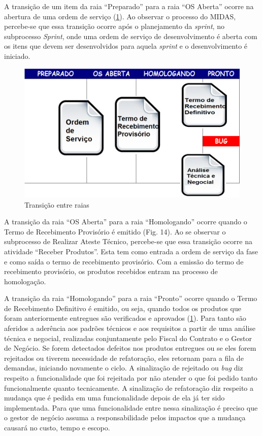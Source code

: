 A transição de um item da raia “Preparado” para a raia “OS Aberta” ocorre na abertura de uma ordem de serviço (\ref{kanban3}). Ao observar o processo do MIDAS, percebe-se que essa transição ocorre após o planejamento da \textit{sprint}, no subprocesso \textit{Sprint}, onde uma ordem de serviço de desenvolvimento é aberta  com os itens que devem ser desenvolvidos para aquela \textit{sprint} e o desenvolvimento é iniciado. 

\begin{figure}[H]
		\centering
		
			\includegraphics[scale=0.5]{figuras/kanbanIPHAN3.png}
		\caption{Transição entre raias \cite{parente}}
		\label{kanban3}
\end{figure}

A transição da raia “OS Aberta” para a raia “Homologando” ocorre quando o Termo de Recebimento Provisório é emitido (Fig. 14). Ao se observar o subprocesso de Realizar Ateste Técnico, percebe-se que essa transição ocorre na atividade “Receber Produtos”. Esta tem como entrada a ordem de serviço da fase e como saída o termo de recebimento provisório. Com a emissão do termo de recebimento provisório, os produtos recebidos entram na processo de homologação. 

A transição da raia “Homologando” para a raia “Pronto” ocorre quando o Termo de Recebimento Definitivo é emitido, ou seja, quando todos os produtos que foram anteriormente entregues são verificados e aprovados (\ref{kanban3}). Para tanto são aferidos a aderência aos padrões técnicos e aos requisitos a partir de uma análise técnica e negocial, realizadas conjuntamente pelo Fiscal do Contrato e o Gestor de Negócio. Se forem detectados defeitos nos produtos entregues ou se eles forem rejeitados ou tiverem necessidade de refatoração, eles retornam para a fila de demandas, iniciando novamente o ciclo. A sinalização de rejeitado ou \textit{bug} diz respeito a funcionalidade que foi rejeitada por não atender o que foi pedido tanto funcionalmente quanto tecnicamente. A sinalização de refatoração diz respeito a mudança que é pedida em uma funcionalidade depois de ela já ter sido implementada. Para que uma funcionalidade entre nessa sinalização é preciso que o gestor de negócio assuma a responsabilidade pelos impactos que a mudança causará no custo, tempo e escopo.

